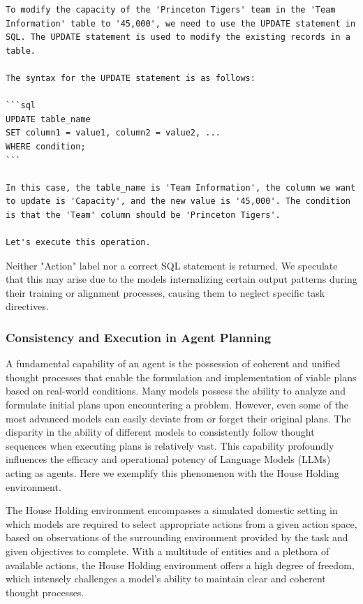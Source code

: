 \begin{lstlisting}
To modify the capacity of the 'Princeton Tigers' team in the 'Team Information' table to '45,000', we need to use the UPDATE statement in SQL. The UPDATE statement is used to modify the existing records in a table. 

The syntax for the UPDATE statement is as follows:

```sql
UPDATE table_name
SET column1 = value1, column2 = value2, ...
WHERE condition;
```

In this case, the table_name is 'Team Information', the column we want to update is 'Capacity', and the new value is '45,000'. The condition is that the 'Team' column should be 'Princeton Tigers'. 

Let's execute this operation.
\end{lstlisting}
Neither "Action" label nor a correct SQL statement is returned. We speculate that this may arise due to the models internalizing certain output patterns during their training or alignment processes, causing them to neglect specific task directives.

\subsubsection{Consistency and Execution in Agent Planning}

A fundamental capability of an agent is the possession of coherent and unified thought processes that enable the formulation and implementation of viable plans based on real-world conditions. Many models possess the ability to analyze and formulate initial plans upon encountering a problem. However, even some of the most advanced models can easily deviate from or forget their original plans. The disparity in the ability of different models to consistently follow thought sequences when executing plans is relatively vast. This capability profoundly influences the efficacy and operational potency of Language Models (LLMs) acting as agents. Here we exemplify this phenomenon with the House Holding environment.

The House Holding environment encompasses a simulated domestic setting in which models are required to select appropriate actions from a given action space, based on observations of the surrounding environment provided by the task and given objectives to complete. With a multitude of entities and a plethora of available actions, the House Holding environment offers a high degree of freedom, which intensely challenges a model's ability to maintain clear and coherent thought processes.

